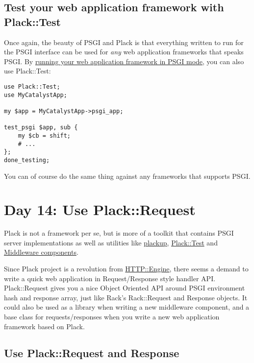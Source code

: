 \section{Test your web application framework with
Plack::Test}\label{test-your-web-application-framework-with-placktest}

Once again, the beauty of PSGI and Plack is that everything written to
run for the PSGI interface can be used for \emph{any} web application
frameworks that speaks PSGI. By
\href{http://advent.plackperl.org/2009/12/day-7-use-web-application-framework-in-psgi.html}{running
your web application framework in PSGI mode}, you can also use
Plack::Test:

\begin{lstlisting}
use Plack::Test;
use MyCatalystApp;

my $app = MyCatalystApp->psgi_app;

test_psgi $app, sub {
    my $cb = shift;
    # ...
};
done_testing;
\end{lstlisting}

You can of course do the same thing against any frameworks that supports
PSGI.

\chapter{Day 14: Use Plack::Request}\label{day-14-use-plackrequest}

Plack is not a framework per se, but is more of a toolkit that contains
PSGI server implementations as well as utilities like
\href{http://advent.plackperl.org/2009/12/day-3-using-plackup.html}{plackup},
\href{http://advent.plackperl.org/2009/12/day-13-use-placktest-to-test-your-application.html}{Plack::Test}
and
\href{http://advent.plackperl.org/2009/12/day-10-using-plack-middleware.html}{Middleware
components}.

Since Plack project is a revolution from
\href{http://search.cpan.org/perldoc?HTTP::Engine}{HTTP::Engine}, there
seems a demand to write a quick web application in Request/Response
style handler API. Plack::Request gives you a nice Object Oriented API
around PSGI environment hash and response array, just like Rack's
Rack::Request and Response objects. It could also be used as a library
when writing a new middleware component, and a base class for
requests/responses when you write a new web application framework based
on Plack.

\section{Use Plack::Request and
Response}\label{use-plackrequest-and-response}

